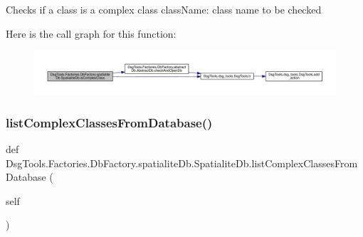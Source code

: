 \begin{DoxyVerb}Checks if a class is a complex class
className: class name to be checked
\end{DoxyVerb}
 Here is the call graph for this function\+:
\nopagebreak
\begin{figure}[H]
\begin{center}
\leavevmode
\includegraphics[width=350pt]{class_dsg_tools_1_1_factories_1_1_db_factory_1_1spatialite_db_1_1_spatialite_db_a410353e9f2234473f8888a4306d2d141_cgraph}
\end{center}
\end{figure}
\mbox{\label{class_dsg_tools_1_1_factories_1_1_db_factory_1_1spatialite_db_1_1_spatialite_db_a07ea8ea944ac40120fe9bb674d46106b}} 
\subsubsection{\texorpdfstring{list\+Complex\+Classes\+From\+Database()}{listComplexClassesFromDatabase()}}
{\footnotesize\ttfamily def Dsg\+Tools.\+Factories.\+Db\+Factory.\+spatialite\+Db.\+Spatialite\+Db.\+list\+Complex\+Classes\+From\+Database (\begin{DoxyParamCaption}\item[{}]{self }\end{DoxyParamCaption})}

